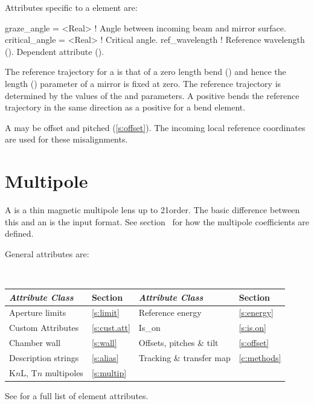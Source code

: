 {Attributes specific to a  element are:
\begin{example}
  graze_angle     = <Real>   ! Angle between incoming beam and mirror surface.
  critical_angle  = <Real>   ! Critical angle.
  ref_wavelength             ! Reference wavelength (). Dependent attribute ().
\end{example}

The reference trajectory for a
 is that of a zero length bend () and
hence the length () parameter of a mirror is fixed at zero. The
reference trajectory is determined by the values of the
 and  parameters. A positive 
bends the reference trajectory in the same direction as a positive
 for a bend element.

A  may be offset and pitched (\ref{s:offset}). The incoming
local reference coordinates are used for these misalignments.

\section{Multipole}
\label{s:mult}

A  is a thin magnetic multipole lens up to 21\St order. The basic
difference between this and an  is the input
format. See section~ for how the multipole coefficients
are defined.

General  attributes are:
\begin{center}
\tt 
\begin{tabular}{llll} \toprule
  {\sl Attribute Class}      & Section           & {\sl Attribute Class}      & Section         \\ \midrule
  Aperture limits            & \ref{s:limit}     & Reference energy           & \ref{s:energy}  \\
  Custom Attributes          & \ref{s:cust.att}  & Is_on                      & \ref{s:is.on}   \\ 
  Chamber wall               & \ref{s:wall}      & Offsets, pitches \& tilt   & \ref{s:offset}  \\
  Description strings        & \ref{s:alias}     & Tracking \& transfer map   & \ref{c:methods} \\ 
  K$n$L, T$n$ multipoles     & \ref{s:multip}    &                            &                 \\
  \bottomrule
\end{tabular}
\end{center}
\toffset
See  for a full list of element attributes.

}
